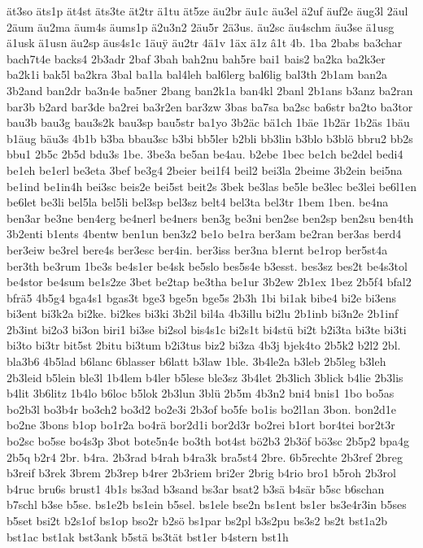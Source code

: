 {ät3so
äts1p
ät4st
äts3te
ät2tr
ä1tu
ät5ze
äu2br
äu1c
äu3el
ä2uf
äuf2e
äug3l
2äul
2äum
äu2ma
äum4s
äums1p
ä2u3n2
2äu5r
2ä3us.
äu2sc
äu4schm
äu3se
ä1usg
ä1usk
ä1usn
äu2sp
äus4s1c
1äu^^ff
äu2tr
4ä1v
1äx
ä1z
â1t
4b.
1ba
2babs
ba3char
bach7t4e
backs4
2b3adr
2baf
3bah
bah2nu
bah5re
bai1
bais2
ba2ka
ba2k3er
ba2k1i
bak5l
ba2kra
3bal
ba1la
bal4leh
bal6lerg
bal6lig
bal3th
2b1am
ban2a
3b2and
ban2dr
ba3n4e
ba5ner
2bang
ban2k1a
ban4kl
2banl
2b1ans
b3anz
ba2ran
bar3b
b2ard
bar3de
ba2rei
ba3r2en
bar3zw
3bas
ba7sa
ba2sc
ba6str
ba2to
ba3tor
bau3b
bau3g
bau3s2k
bau3sp
bau5str
ba1yo
3b2äc
bä1ch
1bäe
1b2är
1b2äs
1bäu
b1äug
bäu3s
4b1b
b3ba
bbau3sc
b3bi
bb5ler
b2bli
bb3lin
b3blo
b3blö
bbru2
bb2s
bbu1
2b5c
2b5d
bdu3s
1be.
3be3a
be5an
be4au.
b2ebe
1bec
be1ch
be2del
bedi4
be1eh
be1erl
be3eta
3bef
be3g4
2beier
bei1f4
beil2
bei3la
2beime
3b2ein
bei5na
be1ind
be1in4h
bei3sc
beis2e
bei5st
beit2s
3bek
be3las
be5le
be3lec
be3lei
be6l1en
be6let
be3li
bel5la
bel5li
bel3sp
bel3sz
belt4
bel3ta
bel3tr
1bem
1ben.
be4na
ben3ar
be3ne
ben4erg
be4nerl
be4ners
ben3g
be3ni
ben2se
ben2sp
ben2su
ben4th
3b2enti
b1ents
4bentw
ben1un
ben3z2
be1o
be1ra
ber3am
be2ran
ber3as
berd4
ber3eiw
be3rel
bere4s
ber3esc
ber4in.
ber3iss
ber3na
b1ernt
be1rop
ber5st4a
ber3th
be3rum
1be3s
be4s1er
be4sk
be5slo
bes5s4e
b3esst.
bes3sz
bes2t
be4s3tol
be4stor
be4sum
be1s2ze
3bet
be2tap
be3tha
be1ur
3b2ew
2b1ex
1bez
2b5f4
bfal2
bfrä5
4b5g4
bga4s1
bgas3t
bge3
bge5n
bge5s
2b3h
1bi
bi1ak
bibe4
bi2e
bi3ens
bi3ent
bi3k2a
bi2ke.
bi2kes
bi3ki
3b2il
bil4a
4b3illu
bi2lu
2b1inb
bi3n2e
2b1inf
2b3int
bi2o3
bi3on
biri1
bi3se
bi2sol
bis4s1c
bi2s1t
bi4stü
bi2t
b2i3ta
bi3te
bi3ti
bi3to
bi3tr
bit5st
2bitu
bi3tum
b2i3tus
biz2
bi3za
4b3j
bjek4to
2b5k2
b2l2
2bl.
bla3b6
4b5lad
b6lanc
6blasser
b6latt
b3law
1ble.
3b4le2a
b3leb
2b5leg
b3leh
2b3leid
b5lein
ble3l
1b4lem
b4ler
b5lese
ble3sz
3b4let
2b3lich
3blick
b4lie
2b3lis
b4lit
3b6litz
1b4lo
b6loc
b5lok
2b3lun
3blü
2b5m
4b3n2
bni4
bnis1
1bo
bo5as
bo2b3l
bo3b4r
bo3ch2
bo3d2
bo2e3i
2b3of
bo5fe
bo1is
bo2l1an
3bon.
bon2d1e
bo2ne
3bons
b1op
bo1r2a
bo4rä
bor2d1i
bor2d3r
bo2rei
b1ort
bor4tei
bor2t3r
bo2sc
bo5se
bo4s3p
3bot
bote5n4e
bo3th
bot4st
bö2b3
2b3öf
bö3sc
2b5p2
bpa4g
2b5q
b2r4
2br.
b4ra.
2b3rad
b4rah
b4ra3k
bra5st4
2bre.
6b5rechte
2b3ref
2breg
b3reif
b3rek
3brem
2b3rep
b4rer
2b3riem
bri2er
2brig
b4rio
bro1
b5roh
2b3rol
b4ruc
bru6s
brust1
4b1s
bs3ad
b3sand
bs3ar
bsat2
b3sä
b4sär
b5sc
b6schan
b7schl
b3se
b5se.
bs1e2b
bs1ein
b5sel.
bs1ele
bse2n
bs1ent
bs1er
bs3e4r3in
b5ses
b5set
bsi2t
b2s1of
bs1op
bso2r
b2sö
bs1par
bs2pl
b3s2pu
bs3s2
bs2t
bst1a2b
bst1ac
bst1ak
bst3ank
b5stä
bs3tät
bst1er
b4stern
bst1h
}
